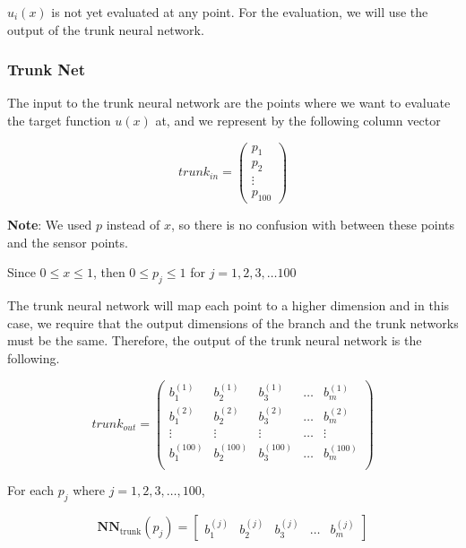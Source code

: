 \documentclass[a4paper,12pt]{article}
\theoremstyle{definition}
\begin{document}
$u_i(x)$ is not yet evaluated at any point. 
For the evaluation, we will use the output of the trunk neural network.

\subsubsection{Trunk Net}
The input to the trunk neural network are the points where we want to 
evaluate the target function $u(x)$ at, and we represent by the following column vector

\begin{equation}
trunk_{in} =
\begin{pmatrix}
p_1 \\
p_2 \\
\vdots \\
p_{100}
\end{pmatrix}
\end{equation}

\textbf{Note}:  We used $p$ instead of $x$, so there is no confusion with between these points and the sensor points.

Since $0 \le x \le 1$, then $0 \le p_j \le 1$ for $j=1, 2, 3, \dots 100$

The trunk neural network will map each point to a higher dimension and in this case, we 
require that the output dimensions of the branch and the trunk networks must be the same. 
Therefore, the output of the trunk neural network is the following.

\begin{equation}
trunk_{out} = \begin{pmatrix}
b^{(1)}_1 & b^{(1)}_2 & b^{(1)}_3 & \dots & b^{(1)}_m\\
b^{(2)}_1 & b^{(2)}_2 & b^{(2)}_3 & \dots & b^{(2)}_m\\
\vdots & \vdots & \vdots & \dots & \vdots \\
b^{(100)}_1 & b^{(100)}_2 & b^{(100)}_3 & \dots & b^{(100)}_m\\
\end{pmatrix}
\end{equation}


For each $p_j$ where $j=1, 2, 3, \dots, 100$,

\begin{equation}
\mathbf{NN}_{\text{trunk}}(p_j) = \begin{bmatrix}
b^{(j)}_1 & b^{(j)}_2 & b^{(j)}_3 & \dots & b^{(j)}_m
\end{bmatrix}
\end{equation}
\end{document}
